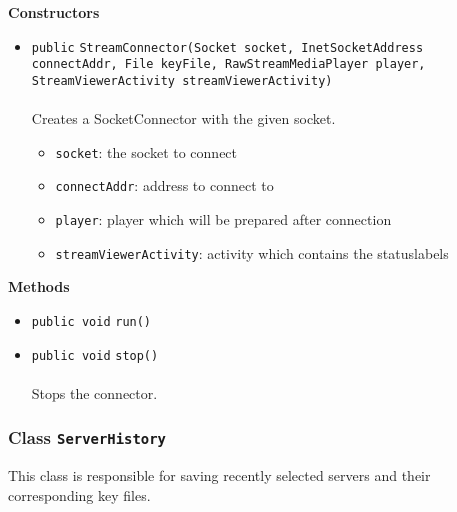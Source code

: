 \textbf{\sffamily Constructors}
\begin{itemize}
\item \lstinline|public| \lstinline|StreamConnector|\lstinline|(Socket socket, InetSocketAddress connectAddr, File keyFile, RawStreamMediaPlayer player, StreamViewerActivity streamViewerActivity)|\\ \\[-0.6em]
Creates a SocketConnector with the given socket.
\begin{itemize}
\item \lstinline|socket|: the socket to connect
\item \lstinline|connectAddr|: address to connect to
\item \lstinline|player|: player which will be prepared after connection
\item \lstinline|streamViewerActivity|: activity which contains the statuslabels
\end{itemize}



\end{itemize}


\textbf{\sffamily Methods}
\begin{itemize}
\item \lstinline|public void| \lstinline|run|\lstinline|()| \\[-0.6em]




\item \lstinline|public void| \lstinline|stop|\lstinline|()|\\ \\[-0.6em]
Stops the connector.



\end{itemize}

\subsubsection{Class \lstinline|ServerHistory|}
This class is responsible for saving recently selected servers
 and their corresponding key files. \\
\noindent\begin{minipage}[t]{5cm}
\vspace{0.3em}
\hspace*{2em}
\vspace{0.3em}
\end{minipage}



